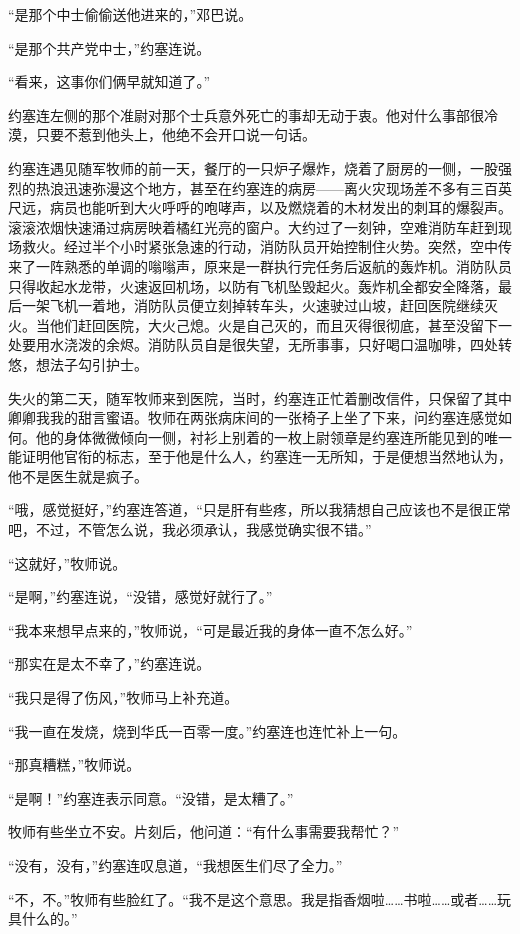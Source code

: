 “是那个中士偷偷送他进来的，”邓巴说。

“是那个共产党中士，”约塞连说。

“看来，这事你们俩早就知道了。”

约塞连左侧的那个准尉对那个士兵意外死亡的事却无动于衷。他对什么事部很冷漠，只要不惹到他头上，他绝不会开口说一句话。

约塞连遇见随军牧师的前一天，餐厅的一只炉子爆炸，烧着了厨房的一侧，一股强烈的热浪迅速弥漫这个地方，甚至在约塞连的病房——离火灾现场差不多有三百英尺远，病员也能听到大火呼呼的咆哮声，以及燃烧着的木材发出的刺耳的爆裂声。滚滚浓烟快速涌过病房映着橘红光亮的窗户。大约过了一刻钟，空难消防车赶到现场救火。经过半个小时紧张急速的行动，消防队员开始控制住火势。突然，空中传来了一阵熟悉的单调的嗡嗡声，原来是一群执行完任务后返航的轰炸机。消防队员只得收起水龙带，火速返回机场，以防有飞机坠毁起火。轰炸机全都安全降落，最后一架飞机一着地，消防队员便立刻掉转车头，火速驶过山坡，赶回医院继续灭火。当他们赶回医院，大火己熄。火是自己灭的，而且灭得很彻底，甚至没留下一处要用水浇泼的余烬。消防队员自是很失望，无所事事，只好喝口温咖啡，四处转悠，想法子勾引护士。



失火的第二天，随军牧师来到医院，当时，约塞连正忙着删改信件，只保留了其中卿卿我我的甜言蜜语。牧师在两张病床间的一张椅子上坐了下来，问约塞连感觉如何。他的身体微微倾向一侧，衬衫上别着的一枚上尉领章是约塞连所能见到的唯一能证明他官衔的标志，至于他是什么人，约塞连一无所知，于是便想当然地认为，他不是医生就是疯子。

“哦，感觉挺好，”约塞连答道，“只是肝有些疼，所以我猜想自己应该也不是很正常吧，不过，不管怎么说，我必须承认，我感觉确实很不错。”

“这就好，”牧师说。

“是啊，”约塞连说，“没错，感觉好就行了。”

“我本来想早点来的，”牧师说，“可是最近我的身体一直不怎么好。”

“那实在是太不幸了，”约塞连说。

“我只是得了伤风，”牧师马上补充道。

“我一直在发烧，烧到华氏一百零一度。”约塞连也连忙补上一句。

“那真糟糕，”牧师说。

“是啊！”约塞连表示同意。“没错，是太糟了。”

牧师有些坐立不安。片刻后，他问道：“有什么事需要我帮忙？”

“没有，没有，”约塞连叹息道，“我想医生们尽了全力。”

“不，不。”牧师有些脸红了。“我不是这个意思。我是指香烟啦……书啦……或者……玩具什么的。”


